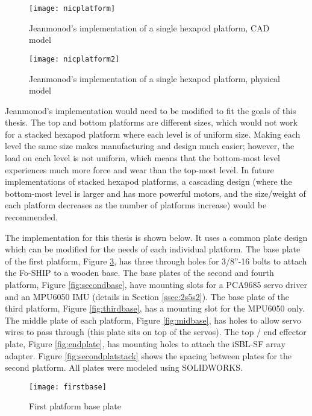 \documentclass[12pt,a4paper]{report}
\begin{document}
\begin{figure}[htbp]
	\centering
	\texttt{[image: nicplatform]}
	\caption{Jeanmonod’s implementation of a single hexapod platform, CAD model \cite{nichub}}
	\label{fig:nicplatform}
\end{figure}

\begin{figure}[htbp]
	\centering
	\texttt{[image: nicplatform2]}
	\caption{Jeanmonod’s implementation of a single hexapod platform, physical model \cite{nicdoc}}
	\label{fig:nicplatform2}
\end{figure}

Jeanmonod's implementation would need to be modified to fit the goals of this thesis. The top and bottom platforms are different sizes, which would not work for a stacked hexapod platform where each level is of uniform size. Making each level the same size makes manufacturing and design much easier; however, the load on each level is not uniform, which means that the bottom-most level experiences much more force and wear than the top-most level. In future implementations of stacked hexapod platforms, a cascading design (where the bottom-most level is larger and has more powerful motors, and the size/weight of each platform decreases as the number of platforms increase) would be recommended.

The implementation for this thesis is shown below. It uses a common plate design which can be modified for the needs of each individual platform. The base plate of the first platform, Figure \ref{fig:firstbase}, has three through holes for 3/8”-16 bolts to attach the Fo-SHIP to a wooden base. The base plates of the second and fourth platform, Figure \ref{fig:secondbase}, have mounting slots for a PCA9685 servo driver and an MPU6050 IMU (details in Section \ref{ssec:2s5s2}). The base plate of the third platform, Figure \ref{fig:thirdbase}, has a mounting slot for the MPU6050 only. The middle plate of each platform, Figure \ref{fig:midbase}, has holes to allow servo wires to pass through (this plate sits on top of the servos). The top / end effector plate, Figure \ref{fig:endplate}, has mounting holes to attach the iSBL-SF array adapter. Figure \ref{fig:secondplatstack} shows the spacing between plates for the second platform. All plates were modeled using SOLIDWORKS.

\begin{figure}[htbp]
	\centering
	\texttt{[image: firstbase]}
	\caption{First platform base plate}
	\label{fig:firstbase}
\end{figure}
\end{document}
